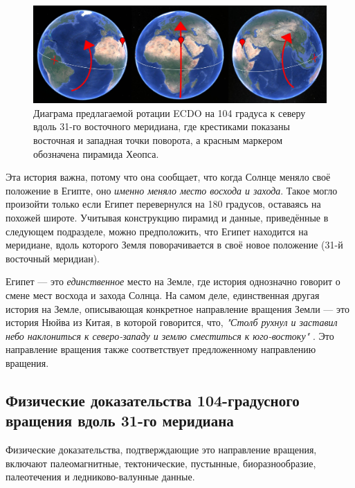 \documentclass[10pt,twocolumn,letterpaper]{article}
\begin{document}
\begin{figure}[t]
\begin{center}
\includegraphics[width=1\textwidth]{drawing.jpg}
\end{center}
   \caption{Диаграма предлагаемой ротации ECDO на 104 градуса к северу вдоль 31-го восточного меридиана, где крестиками показаны восточная и западная точки поворота, а красным маркером обозначена пирамида Хеопса.}
\label{fig:6}
\end{figure}

Эта история важна, потому что она сообщает, что когда Солнце меняло своё положение в Египте, оно \textit{именно меняло место восхода и захода}. Такое могло произойти только если Египет перевернулся на 180 градусов, оставаясь на похожей широте. Учитывая конструкцию пирамид и данные, приведённые в следующем подразделе, можно предположить, что Египет находится на меридиане, вдоль которого Земля поворачивается в своё новое положение (31-й восточный меридиан).

Египет — это \textit{единственное} место на Земле, где история однозначно говорит о смене мест восхода и захода Солнца. На самом деле, единственная другая история на Земле, описывающая конкретное направление вращения Земли — это история Нюйва из Китая, в которой говорится, что, \textit{"Столб рухнул и заставил небо наклониться к северо-западу и землю сместиться к юго-востоку"} \cite{8}. Это направление вращения также соответствует предложенному направлению вращения.

\subsection{Физические доказательства 104-градусного вращения вдоль 31-го меридиана}

Физические доказательства, подтверждающие это направление вращения, включают палеомагнитные, тектонические, пустынные, биоразнообразие, палеотечения и ледниково-валунные данные.
\end{document}
